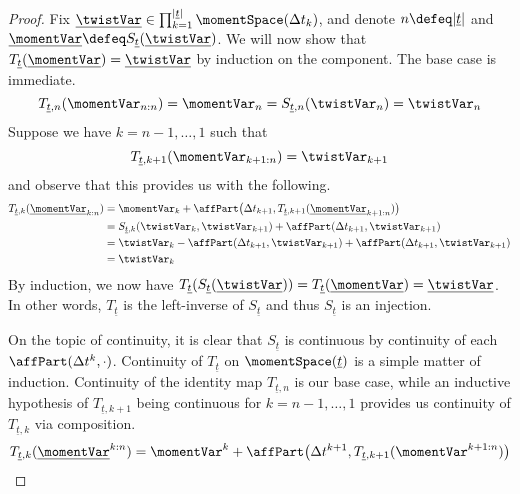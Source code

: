 \begin{proof}
  \label{proof:lemma:S-injection}
  Fix $\underline\twistVar \in \prod_{k=1}^{|\underline t|} \momentSpace(\Delta t_k)$, and denote $n \defeq |\underline t|$ and $\underline\momentVar \defeq S_{\underline t}(\underline\twistVar)$.
  We will now show that $T_{\underline t}(\underline\momentVar) = \underline\twistVar$ by induction on the component.
  The base case is immediate.
  \begin{equation}
    T_{\underline t, n}(\momentVar_{n:n}) = \momentVar_n = S_{\underline t, n}(\twistVar_n) = \twistVar_n
  \end{equation}
  Suppose we have $k = n -1, \ldots, 1$ such that
  \begin{equation}
    T_{\underline t, k + 1}(\momentVar_{k+1:n}) = \twistVar_{k+1} 
  \end{equation}
  and observe that this provides us with the following.
  \begin{align}
    T_{\underline t, k}(\underline\momentVar_{k:n}) 
    &= \momentVar_k + \affPart\big(\Delta t_{k+1},T_{\underline t, k+1}(\underline\momentVar_{k+1:n})\big) \\
    &= S_{\underline t,k}(\twistVar_k, \twistVar_{k+1}) + \affPart(\Delta t_{k+1}, \twistVar_{k+1}) \\
    &= \twistVar_k - \affPart(\Delta t_{k+1}, \twistVar_{k+1}) + \affPart(\Delta t_{k+1}, \twistVar_{k+1}) \\
    &= \twistVar_k
  \end{align}
  By induction, we now have $T_{\underline t}(S_{\underline t}(\underline\twistVar)) = T_{\underline t}(\underline\momentVar) = \underline\twistVar$.
  In other words, $T_{\underline t}$ is the left-inverse of $S_{\underline t}$ and thus $S_{\underline t}$ is an injection.

  On the topic of continuity, it is clear that $S_{\underline t}$ is continuous by continuity of each $\affPart(\Delta t^k, \cdot)$.
  Continuity of $T_{\underline t}$ on $\momentSpace(\underline t)$ is a simple matter of induction.
  Continuity of the identity map $T_{\underline t, n}$ is our base case, while an inductive hypothesis of $T_{\underline t, k+1}$ being continuous for $k = n-1,\ldots,1$ provides us continuity of $T_{\underline t, k}$ via composition.
  \begin{equation}
    T_{\underline t, k}(\underline\momentVar^{k:n}) = \momentVar^k + \affPart\big( \Delta t^{k+1}, T_{\underline t, k+1}(\momentVar^{k+1:n}) \big)
  \end{equation}
\end{proof}
